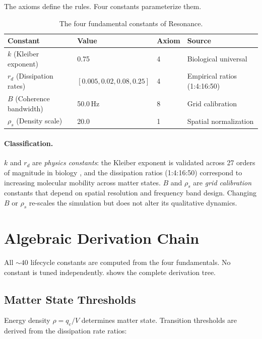 \documentclass[11pt,a4paper]{article}
\begin{document}
The axioms define the rules. Four constants parameterize them.

\begin{table}[h]
\centering
\caption{The four fundamental constants of Resonance.}
\label{tab:constants}
\begin{tabular}{@{}llll@{}}
\toprule
\textbf{Constant} & \textbf{Value} & \textbf{Axiom} & \textbf{Source} \\
\midrule
$k$ (Kleiber exponent) & 0.75 & 4 & Biological universal \citep{kleiber1932body,west1997general} \\
$r_d$ (Dissipation rates) & $[0.005, 0.02, 0.08, 0.25]$ & 4 & Empirical ratios (1:4:16:50) \\
$B$ (Coherence bandwidth) & 50.0\,Hz & 8 & Grid calibration \\
$\rho_s$ (Density scale) & 20.0 & 1 & Spatial normalization \\
\bottomrule
\end{tabular}
\end{table}

\paragraph{Classification.}
$k$ and $r_d$ are \emph{physics constants}: the Kleiber exponent
is validated across 27 orders of magnitude in biology
\citep{west1997general},
and the dissipation ratios (1:4:16:50) correspond to
increasing molecular mobility across matter states.
$B$ and $\rho_s$ are \emph{grid calibration} constants
that depend on spatial resolution and frequency band design.
Changing $B$ or $\rho_s$ re-scales the simulation but does
not alter its qualitative dynamics.

\section{Algebraic Derivation Chain}
\label{sec:derivation}

All ${\sim}40$ lifecycle constants are computed from the four
fundamentals. No constant is tuned independently.
 shows the complete derivation tree.

\subsection{Matter State Thresholds}

Energy density $\rho = q_e / V$ determines matter state.
Transition thresholds are derived from the dissipation
rate ratios:
\end{document}
